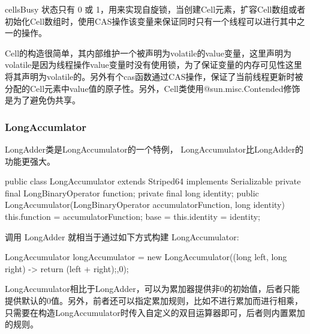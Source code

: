 cellsBusy 状态只有 0 或 1，用来实现自旋锁，当创建Cell元素，扩容Cell数组或者初始化Cell数组时，使用CAS操作该变量来保证同时只有一个线程可以进行其中之一的操作。

Cell的构造很简单，其内部维护一个被声明为volatile的value变量，这里声明为volatile是因为线程操作value变量时没有使用锁，为了保证变量的内存可见性这里将其声明为volatile的。另外有个cas函数通过CAS操作，保证了当前线程更新时被分配的Cell元素中value值的原子性。另外，Cell类使用@sun.misc.Contended修饰是为了避免伪共享。

\subsubsection{LongAccumlator}

LongAdder类是LongAccumulator的一个特例， LongAccumulator比LongAdder的功能更强大。

\begin{Java}
public class LongAccumulator extends Striped64 implements Serializable {
    private final LongBinaryOperator function;
    private final long identity;
    public LongAccumulator(LongBinaryOperator accumulatorFunction, long identity) {
        this.function = accumulatorFunction;
        base = this.identity = identity;
    }
}
\end{Java}

调用 LongAdder 就相当于通过如下方式构建 LongAccumulator:

\begin{Java}
LongAccumulator longAccumulator = new LongAccumulator((long left, long right) -> {return (left + right);},0);
\end{Java}

LongAccumulator相比于LongAdder，可以为累加器提供非0的初始值，后者只能提供默认的0值。另外，前者还可以指定累加规则，比如不进行累加而进行相乘，只需要在构造LongAccumulator时传入自定义的双目运算器即可，后者则内置累加的规则。

\newpage